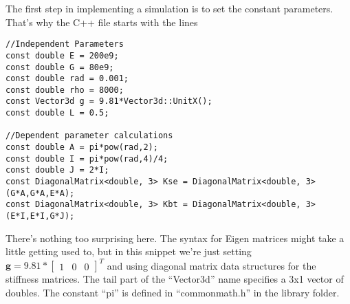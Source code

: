 \documentclass[12pt]{article}
\begin{document}
The first step in implementing a simulation is to set the constant parameters. That's why the C++ file starts with the lines
\begin{lstlisting}
//Independent Parameters
const double E = 200e9;
const double G = 80e9;
const double rad = 0.001;
const double rho = 8000;
const Vector3d g = 9.81*Vector3d::UnitX();
const double L = 0.5;

//Dependent parameter calculations
const double A = pi*pow(rad,2);
const double I = pi*pow(rad,4)/4;
const double J = 2*I;
const DiagonalMatrix<double, 3> Kse = DiagonalMatrix<double, 3>(G*A,G*A,E*A);
const DiagonalMatrix<double, 3> Kbt = DiagonalMatrix<double, 3>(E*I,E*I,G*J);
\end{lstlisting}
There's nothing too surprising here. The syntax for Eigen matrices might take a little getting used to, but in this snippet we're just setting $\boldsymbol{g} = 9.81*\begin{bmatrix} 1 & 0 & 0 \end{bmatrix}^T$ and using diagonal matrix data structures for the stiffness matrices. The tail part of the ``Vector3d'' name specifies a 3x1 vector of doubles. The constant ``pi'' is defined in ``commonmath.h'' in the library folder.
\end{document}

